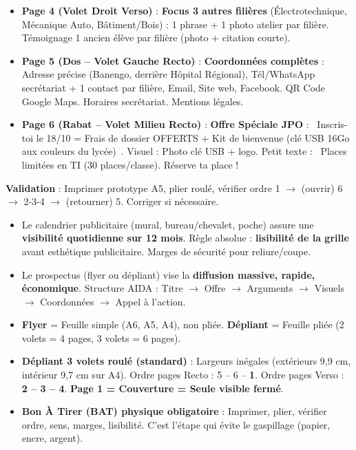 \documentclass[11pt]{article}
\newcommand{\cle}[1]{{\popxbold\color{popdark}#1}}
\begin{document}
\begin{corrige}
\begin{enumerate}
\begin{itemize}
  \item \textbf{Page 4 (Volet Droit Verso)} : \textbf{Focus 3 autres filières} (Électrotechnique, Mécanique Auto, Bâtiment/Bois) : 1 phrase + 1 photo atelier par filière. Témoignage 1 ancien élève par filière (photo + citation courte).
  \item \textbf{Page 5 (Dos -- Volet Gauche Recto)} : \textbf{Coordonnées complètes} : Adresse précise (Banengo, derrière Hôpital Régional), Tél/WhatsApp secrétariat + 1 contact par filière, Email, Site web, Facebook. QR Code Google Maps. Horaires secrétariat. Mentions légales.
  \item \textbf{Page 6 (Rabat -- Volet Milieu Recto)} : \textbf{Offre Spéciale JPO} : \og~Inscris-toi le 18/10 = Frais de dossier OFFERTS + Kit de bienvenue (clé USB 16Go aux couleurs du lycée)~\fg{}. Visuel : Photo clé USB + logo. Petit texte : \og~Places limitées en TI (30 places/classe). Réserve ta place !~\fg{}
  \end{itemize}
  \textbf{Validation} : Imprimer prototype A5, plier roulé, vérifier ordre 1 $\rightarrow$ (ouvrir) 6 $\rightarrow$ 2-3-4 $\rightarrow$ (retourner) 5. Corriger si nécessaire.
\end{enumerate}
\end{corrige}

\begin{aretenir}
\begin{itemize}
\item Le \cle{calendrier publicitaire} (mural, bureau/chevalet, poche) assure une \textbf{visibilité quotidienne sur 12 mois}. Règle absolue : \textbf{lisibilité de la grille} avant esthétique publicitaire. Marges de sécurité pour reliure/coupe.
\item Le \cle{prospectus} (flyer ou dépliant) vise la \textbf{diffusion massive, rapide, économique}. Structure AIDA : Titre $\rightarrow$ Offre $\rightarrow$ Arguments $\rightarrow$ Visuels $\rightarrow$ Coordonnées $\rightarrow$ Appel à l'action.
\item \textbf{Flyer} = Feuille simple (A6, A5, A4), non pliée. \textbf{Dépliant} = Feuille pliée (2 volets = 4 pages, 3 volets = 6 pages).
\item \textbf{Dépliant 3 volets roulé (standard)} : Largeurs inégales (extérieurs 9,9 cm, intérieur 9,7 cm sur A4). Ordre pages Recto : 5 -- 6 -- \textbf{1}. Ordre pages Verso : \textbf{2 -- 3 -- 4}. \textbf{Page 1 = Couverture = Seule visible fermé}.
\item \textbf{Bon À Tirer (BAT) physique obligatoire} : Imprimer, plier, vérifier ordre, sens, marges, lisibilité. C'est l'étape qui évite le gaspillage (papier, encre, argent).
\end{itemize}
\end{aretenir}
\end{document}
